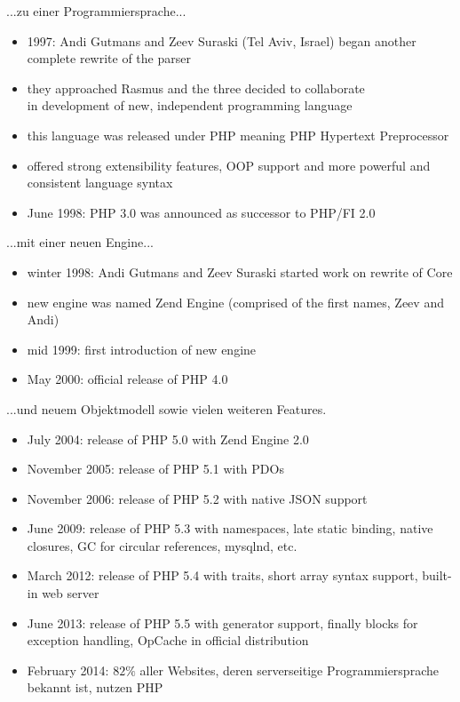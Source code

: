 \documentclass{beamer}
\begin{document}
	\begin{frame}{...zu einer Programmiersprache...}
		\begin{itemize}
			\item 1997: Andi Gutmans and Zeev Suraski (Tel Aviv, Israel) began another complete rewrite of the parser
			\item they approached Rasmus and the three decided to collaborate \\
			in development of new, independent programming language
			\item this language was released under PHP meaning PHP Hypertext Preprocessor
			\item offered strong extensibility features, OOP support and more powerful and consistent language syntax
			\item June 1998: PHP 3.0 was announced as successor to PHP/FI 2.0
		\end{itemize}
	\end{frame}
	
	\begin{frame}{...mit einer neuen Engine...}
		\begin{itemize}
			\item winter 1998: Andi Gutmans and Zeev Suraski started work on rewrite of Core
			\item new engine was named Zend Engine (comprised of the first names, Zeev and Andi)
			\item mid 1999: first introduction of new engine
			\item May 2000: official release of PHP 4.0
		\end{itemize}
	\end{frame}
	
	\begin{frame}{...und neuem Objektmodell sowie vielen weiteren Features.}
		\begin{itemize}
			\item July 2004: release of PHP 5.0 with Zend Engine 2.0
			\item November 2005: release of PHP 5.1 with PDOs
			\item November 2006: release of PHP 5.2 with native JSON support
			\item June 2009: release of PHP 5.3 with namespaces, late static binding, native closures, GC for circular references, mysqlnd, etc.
			\item March 2012: release of PHP 5.4 with traits, short array syntax support, built-in web server
			\item June 2013: release of PHP 5.5 with generator support, finally blocks for exception handling, OpCache in official distribution
			\item February 2014: $82\%$ aller Websites, deren serverseitige Programmiersprache bekannt ist, nutzen PHP
		\end{itemize}
	\end{frame}
	
\end{document}
